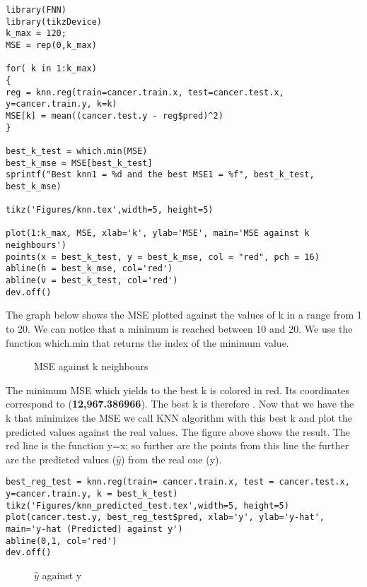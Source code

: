 \documentclass[]{report}
\begin{document}
\begin{lstlisting}
library(FNN)
library(tikzDevice)
k_max = 120;
MSE = rep(0,k_max)

for( k in 1:k_max)
{
reg = knn.reg(train=cancer.train.x, test=cancer.test.x, y=cancer.train.y, k=k)
MSE[k] = mean((cancer.test.y - reg$pred)^2)
}

best_k_test = which.min(MSE)
best_k_mse = MSE[best_k_test]
sprintf("Best knn1 = %d and the best MSE1 = %f", best_k_test, best_k_mse)

tikz('Figures/knn.tex',width=5, height=5)

plot(1:k_max, MSE, xlab='k', ylab='MSE', main='MSE against k neighbours')
points(x = best_k_test, y = best_k_mse, col = "red", pch = 16)
abline(h = best_k_mse, col='red')
abline(v = best_k_test, col='red')
dev.off()
\end{lstlisting}

The graph below shows the MSE plotted against the values of k in a range from 1 to 20. We can notice that a minimum is reached between 10 and 20. We use the function which.min that returns the index of the minimum value.\\
	
\begin{figure}[!hb]
	\centering
	
	\caption{MSE against k neighbours}
\end{figure}

 The minimum MSE which yields to the best k is colored in red. Its coordinates correspond to (\textbf{12,967.386966}). The best k is therefore .
Now that we have the k that minimizes the MSE we call KNN algorithm with this best k and plot the predicted values against the real values. The figure above shows the result. The red line is the function y=x; so further are the points from this line the further are the predicted values ($\hat{y}$) from the real one (y).

\begin{lstlisting}
best_reg_test = knn.reg(train= cancer.train.x, test = cancer.test.x, y=cancer.train.y, k = best_k_test)
tikz('Figures/knn_predicted_test.tex',width=5, height=5)
plot(cancer.test.y, best_reg_test$pred, xlab='y', ylab='y-hat', main='y-hat (Predicted) against y')
abline(0,1, col='red')
dev.off() 
\end{lstlisting}

\begin{figure}[!h]
	\centering
	
	\caption{$\hat{y}$ against y}
\end{figure}
\end{document}
